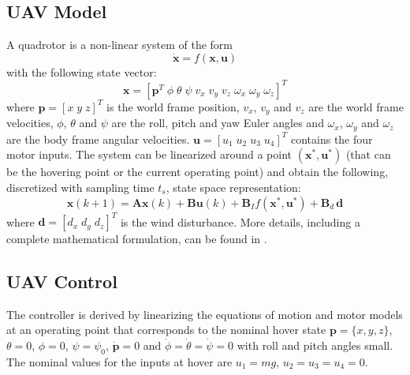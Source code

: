 \documentclass[letterpaper, 10 pt, conference]{ieeeconf}  %
\begin{document}
\subsection{UAV Model}
A quadrotor is a non-linear system of the form 
\begin{equation}
\dot{\bm{x}} = f(\bm{x}, \bm{u})
\end{equation}
with the following state vector:
\begin{equation}
 \bm{x} = \left[ \bm{p}^{T}\; \phi \;  \theta \;  \psi \;  v_x \;  v_y \;  v_z \;  \omega_{x} \;  \omega_{y} \;  \omega_{z} \right]^{T}
 \end{equation}
where $\bm{p}=[x \; y \; z]^{T}$ is the world frame position, $v_{x}$, $v_{y}$ and $v_z$ are the world frame velocities, $\phi$, $\theta$ and $\psi$ are the roll, pitch and yaw Euler angles and $\omega_{x}$, $\omega_{y}$ and $\omega_{z}$ are the body frame angular velocities. $\bm{u} = \left[ u_1\; u_2\; u_3\; u_4 \right]^{T}$ contains the four motor inputs.
The system can be linearized around a point $\left(\bm{x}^{*}, \bm{u}^{*}\right)$ (that can be the hovering point or the current operating point) and obtain the following, discretized with sampling time $t_s$, state space representation:
 \begin{equation}
 \bm{x}(k+1) =  \bm{A} \bm{x}(k) + \bm{B} \bm{u}(k) + \bm{B}_I f\left(\bm{x}^{*}, \bm{u}^{*}\right) + \bm{B}_d \, \bm{d}
 \end{equation}
where $\bm{d} = [d_x \; d_y \; d_z]^{T}$ is the wind disturbance. 
More details, including a complete mathematical formulation, can be found in \cite{bezzo2016online,bezzo2014cooperative, michael2010grasp, shoukry2015secure}.

\subsection{UAV Control}
The controller is derived by linearizing the equations of motion and motor models at an operating point that corresponds to the nominal hover state ${\bm p} = \{x, y, z\}$, $\theta = 0$, $\phi = 0$, $\psi = \psi_0$, ${\dot{\bm p} = 0}$ and $\dot{\phi} = \dot{\theta} = \dot{\psi} = 0$ with roll and pitch angles small. The nominal values for the inputs at hover are $u_1 = mg$, $u_2 = u_3 = u_4 = 0$.
\end{document}
